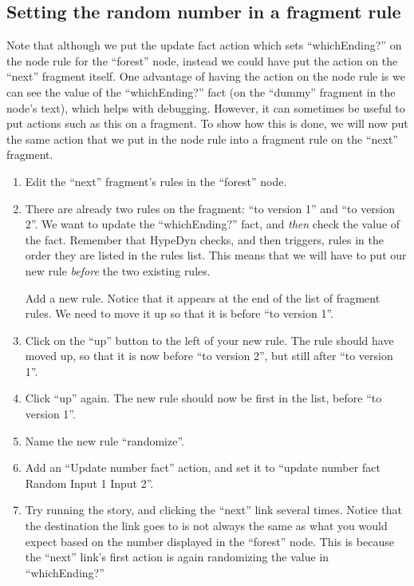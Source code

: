 \documentclass{article}
\begin{document}
\subsection{Setting the random number in a fragment rule}

Note that although we put the update fact action which sets ``whichEnding?'' on the node rule for the ``forest'' node, instead we could have put the action on the ``next'' fragment itself. One advantage of having the action on the node rule is we can see the value of the ``whichEnding?'' fact (on the ``dummy'' fragment in the node's text), which helps with debugging. However, it can sometimes be useful to put actions such as this on a fragment. To show how this is done, we will now put the same action that we put in the node rule into a fragment rule on  the ``next'' fragment.

\begin{enumerate}
    \item Edit the ``next'' fragment's rules in the ``forest'' node.
    \item There are already two rules on the fragment: ``to version 1'' and ``to version 2''. We want to update the ``whichEnding?'' fact, and \textit{then} check the value of the fact. Remember that HypeDyn checks, and then triggers, rules in the order they are listed in the rules list. This means that we will have to put our new rule \textit{before} the two existing rules.
    
Add a new rule. Notice that it appears at the end of the list of fragment rules. We need to move it up so that it is before ``to version 1''.
    \item Click on the ``up'' button to the left of your new rule. The rule should have moved up, so that it is now before ``to version 2'', but still after ``to version 1''.
    \item Click ``up'' again. The new rule should now be first in the list, before ``to version 1''.
    \item Name the new rule ``randomize''.
    \item Add an ``Update number fact'' action, and set it to ``update number fact Random Input 1 Input 2''.
    \item Try running the story, and clicking the ``next'' link several times. Notice that the destination the link goes to is not always the same as what you would expect based on the number displayed in the ``forest'' node. This is because the ``next'' link's first action is again randomizing the value in ``whichEnding?''
\end{enumerate}
\end{document}
